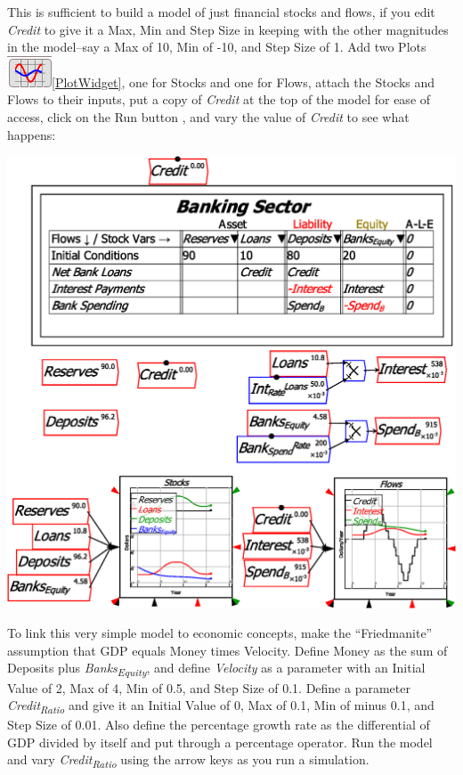 This is sufficient to build a model of just financial stocks and flows,
if you edit \emph{Credit} to give it a Max, Min and Step Size in keeping
with the other magnitudes in the model--say a Max of 10, Min of -10,
and Step Size of 1. Add two Plots \includegraphics{images/plotWidget}\ref{PlotWidget},
one for Stocks and one for Flows, attach the Stocks and Flows to their
inputs, put a copy of \emph{Credit} at the top of the model for ease
of access, click on the Run button , and
vary the value of \emph{Credit }to see what happens:

\includegraphics{images/MonetaryModel01GodleyTable06Simulate01}

To link this very simple model to economic concepts, make the ``Friedmanite''
assumption that GDP equals Money times Velocity. Define Money as the
sum of Deposits plus \emph{Banks}\textsubscript{\emph{Equity}},
and define \emph{Velocity} as a parameter with an Initial Value of
2, Max of 4, Min of 0.5, and Step Size of 0.1. Define a parameter
\emph{Credit}\textsubscript{\emph{Ratio}} and give it an Initial
Value of 0, Max of 0.1, Min of minus 0.1, and Step Size of 0.01. Also
define the percentage growth rate as the differential of GDP divided
by itself and put through a percentage operator. Run the model and
vary \emph{Credit}\textsubscript{\emph{Ratio}} using the arrow keys
as you run a simulation.

